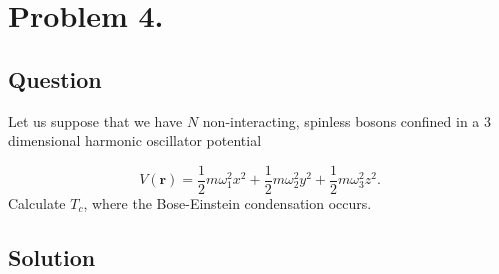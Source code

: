 \section*{Problem 4.}
\subsection*{Question}
Let us suppose that we have $N$ non-interacting, spinless bosons confined in a $3$ dimensional harmonic oscillator potential

\begin{equation}
V \left( \boldsymbol{r} \right)
=
\frac{1}{2} m \omega_{1}^{2} x^{2}
+
\frac{1}{2} m \omega_{2}^{2} y^{2}
+
\frac{1}{2} m \omega_{3}^{2} z^{2}.
\end{equation}
Calculate $T_{c}$, where the Bose-Einstein condensation occurs.

\subsection*{Solution}
